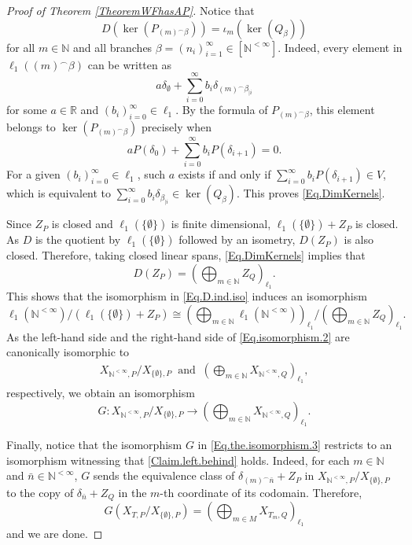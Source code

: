 \documentclass[letterpaper]{amsart}
\numberwithin{equation}{section}
\theoremstyle{definition}
\newcommand{\N}{{\mathbb{N}}}
\newcommand{\R}{{\mathbb{R}}}
\begin{document}
\begin{proof}[Proof of Theorem \ref{TheoremWFhasAP}]
Notice that 
\begin{equation}\label{Eq.DimKernels}D(\ker(P_{(m)^\smallfrown\beta}))=\iota_m(\ker(Q_\beta))\end{equation}
for all $m\in\N$ and all branches $\beta=(n_i)_{i=1}^\infty\in [\N^{<\infty}]$. Indeed, every element in $\ell_1((m)^\smallfrown\beta)$ can be written as
\[a\delta_\emptyset+
\sum_{i=0}^\infty b_i\delta_{(m)^\smallfrown\beta_{|i}}\]
for some  $a\in\R$ and  $(b_i)_{i=0}^\infty\in\ell_1$. By the formula of $P_{(m)^\smallfrown\beta}$, this element belongs to $\ker(P_{(m)^\smallfrown\beta})$  precisely when
\[aP(\delta_0)+\sum_{i=0}^\infty b_iP(\delta_{i+1})=0.\]
For a given $(b_i)_{i=0}^\infty \in \ell_1$, such $a$ exists if and only if 
$\sum_{i=0}^\infty b_iP(\delta_{i+1})\in V$, which is equivalent to  $\sum_{i=0}^\infty b_i\delta_{\beta_{|i}}\in\ker(Q_\beta)$. This proves \eqref{Eq.DimKernels}.

Since $Z_P$ is closed and $\ell_1(\{\emptyset\})$ is finite dimensional, $\ell_1(\{\emptyset\})+Z_P$ is closed. As $D$ is the quotient by $\ell_1(\{\emptyset\})$ followed by an isometry, $D(Z_P)$ is also closed. Therefore, taking closed linear spans, \eqref{Eq.DimKernels} implies that 
\[D(Z_P)=\left(\bigoplus_{m\in\N}Z_Q\right)_{\ell_1}.\]
This shows that  the   isomorphism in \eqref{Eq.D.ind.iso} induces an isomorphism
\begin{equation}\label{Eq.isomorphism.2}\ell_1(\N^{<\infty})/ (\ell_1(\{\emptyset\})+Z_P)
\cong
\left(\bigoplus_{m\in\N}\ell_1(\N^{<\infty})\right)_{\ell_1}
\bigg/
\left(\bigoplus_{m\in\N}Z_Q\right)_{\ell_1}.\end{equation}
As the left-hand side and the right-hand side of \eqref{Eq.isomorphism.2} are canonically isomorphic to 
\begin{align*}
X_{\N^{<\infty},P}/X_{\{\emptyset\},P}
  \ \text{ and }\  \left(\bigoplus_{m\in\N}X_{\N^{<\infty},Q}\right)_{\ell_1},
\end{align*}
respectively, we obtain an isomorphism 
\begin{equation}\label{Eq.the.isomorphism.3}
G\colon     X_{\N^{<\infty},P}/X_{\{\emptyset\},P}\to \left(\bigoplus_{m\in\N}X_{\N^{<\infty},Q}\right)_{\ell_1}.
\end{equation}

Finally, notice that the isomorphism $G$ in \eqref{Eq.the.isomorphism.3} restricts to an isomorphism witnessing that \eqref{Claim.left.behind} holds. Indeed, for each $m\in \N$ and $\bar n\in \N^{<\infty}$,  $G$ sends the equivalence class of $\delta_{(m)^\smallfrown\bar n}+Z_P$ in  $X_{\N^{<\infty},P}/X_{\{\emptyset\},P}$ to the copy of  $\delta_{\bar n}+Z_Q$ in the $m$-th coordinate of its codomain. Therefore, 
\[G\left(X_{T,P}/X_{\{\emptyset\}, P}\right)=
\left(\bigoplus_{m\in M}X_{T_m,Q}\right)_{\ell_1}
\] and we are done.
 \end{proof}
\end{document}
